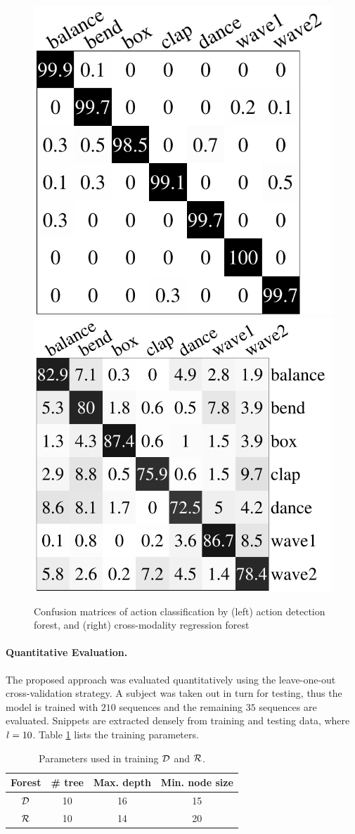 \begin{figure}
	\centering
	\includegraphics[height=0.30\linewidth]{fig/body/confm_detection.pdf} \hspace{1cm} 
	\includegraphics[height=0.30\linewidth]{fig/body/confm_regression.pdf}
	\caption{Confusion matrices of action classification by (left) action detection forest, and (right) cross-modality regression forest} 
	\label{fig/body/confm}
\end{figure}

\paragraph{Quantitative Evaluation.}
\label{sec/body/quant}
The proposed approach was evaluated quantitatively using the leave-one-out cross-validation strategy. A subject was taken out in turn for testing, thus the model is trained with $210$ sequences and the remaining $35$ sequences are evaluated. 
Snippets are extracted densely from training and testing data, where $l = 10$. 
Table \ref{tab/body/rf_train_params} lists the training parameters. 

\begin{table}
	\centering
	\begin{tabular}{|c|c|c|c|}
		\hline 
		Forest & \# tree & Max. depth & Min. node size \\ \hline 
		$\mathcal{D}$ & 10 & 16 & 15 \\ \hline 
		$\mathcal{R}$ & 10 & 14 & 20 \\ \hline 
	\end{tabular} 
	\caption{Parameters used in training $\mathcal{D}$ and $\mathcal{R}$.}
	\label{tab/body/rf_train_params}
\end{table}

